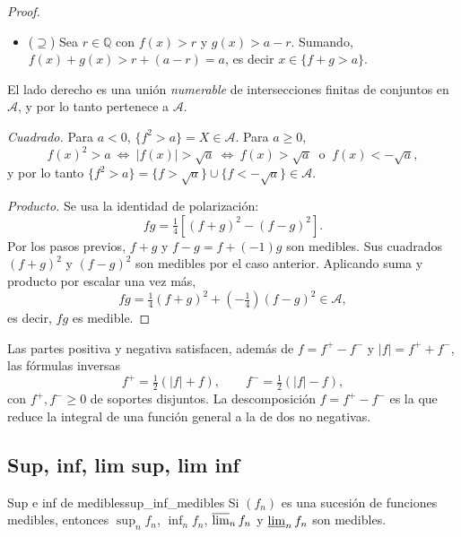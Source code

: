\documentclass[11pt, a4paper]{article}
\begin{document}
\begin{proof}
\begin{itemize}
    \item ($\supseteq$) Sea $r \in \mathbb{Q}$ con $f(x) > r$ y $g(x) > a - r$. Sumando, $f(x) +
    g(x) > r + (a - r) = a$, es decir $x \in \{f + g > a\}$.
\end{itemize}
El lado derecho es una unión \emph{numerable} de
intersecciones finitas de conjuntos en $\mathcal{A}$, y por lo tanto pertenece a $\mathcal{A}$.

\textit{Cuadrado.} Para $a < 0$, $\{f^2 > a\} = X \in \mathcal{A}$. Para $a \ge 0$,
$$ f(x)^2 > a \ \Leftrightarrow \ |f(x)| > \sqrt{a} \ \Leftrightarrow \ f(x) > \sqrt{a} \ \text{ o }
\ f(x) < -\sqrt{a}, $$
y por lo tanto $\{f^2 > a\} = \{f > \sqrt{a}\} \cup \{f < -\sqrt{a}\} \in \mathcal{A}$.

\textit{Producto.} Se usa la identidad de polarización:
$$ fg = \tfrac{1}{4} \left[ (f + g)^2 - (f - g)^2 \right]. $$
Por los pasos previos, $f + g$ y $f - g = f + (-1) g$ son medibles.
Sus cuadrados $(f + g)^2$ y $(f - g)^2$ son medibles por el caso anterior. Aplicando suma y
producto por escalar una vez más,
$$ fg = \tfrac{1}{4}(f + g)^2 + \left(-\tfrac{1}{4}\right)(f - g)^2 \in \mathcal{A}, $$
es decir, $fg$ es medible.
\end{proof}

\obs Las partes positiva y negativa satisfacen, además de $f = f^+ - f^-$ y $|f| = f^+ + f^-$,
las fórmulas inversas
$$ f^+ = \tfrac{1}{2}(|f| + f), \qquad f^- = \tfrac{1}{2}(|f| - f), $$
con $f^+, f^- \ge 0$ de soportes disjuntos. La descomposición $f = f^+ - f^-$ es la que reduce
la integral de una función general a la de dos no negativas.

\subsection{Sup, inf, lim sup, lim inf}

\begin{teorema}{Sup e inf de medibles}{sup_inf_medibles}
Si $(f_n)$ es una sucesión de funciones medibles, entonces $\sup_n f_n$, $\inf_n f_n$,
$\varlimsup_n f_n$ y $\varliminf_n f_n$ son medibles.
\end{teorema}
\end{document}
